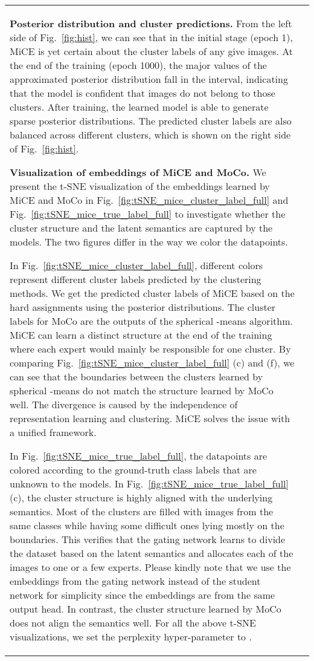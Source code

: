 \documentclass{article} \usepackage{iclr2021_conference,times}
\begin{document}
\begin{table}[t]
\begin{subtable}[h]{0.49\textwidth}
{\begin{tabular}{@{}lc@{}}
{\bf Posterior distribution and cluster predictions.} From the left side of Fig.~\ref{fig:hist}, we can see that in the initial stage (epoch 1), MiCE is yet certain about the cluster labels of any give images. At the end of the training (epoch 1000), the major values of the approximated posterior distribution fall in the  interval, indicating that the model is confident that images do not belong to those clusters. After training, the learned model is able to generate sparse posterior distributions. The predicted cluster labels are also balanced across different clusters, which is shown on the right side of Fig.~\ref{fig:hist}.








{\bf Visualization of embeddings of MiCE and MoCo.} 
We present the t-SNE visualization of the embeddings learned by MiCE and MoCo in Fig.~\ref{fig:tSNE_mice_cluster_label_full} and Fig.~\ref{fig:tSNE_mice_true_label_full} to investigate whether the cluster structure and the latent semantics are captured by the models. The two figures differ in the way we color the datapoints. 

In Fig.~\ref{fig:tSNE_mice_cluster_label_full}, different colors represent different cluster labels predicted by the clustering methods. We get the predicted cluster labels of MiCE based on the hard assignments using the posterior distributions. The cluster labels for MoCo are the outputs of the spherical -means algorithm. MiCE can learn a distinct structure at the end of the training where each expert would mainly be responsible for one cluster. By comparing Fig.~\ref{fig:tSNE_mice_cluster_label_full} (c) and (f), we can see that the boundaries between the clusters learned by spherical -means do not match the structure learned by MoCo well. The divergence is caused by the independence of representation learning and clustering. MiCE solves the issue with a unified framework.



In Fig.~\ref{fig:tSNE_mice_true_label_full}, the datapoints are colored according to the ground-truth class labels that are unknown to the models. In Fig.~\ref{fig:tSNE_mice_true_label_full}(c), the cluster structure is highly aligned with the underlying semantics. Most of the clusters are filled with images from the same classes while having some difficult ones lying mostly on the boundaries. This verifies that the gating network learns to divide the dataset based on the latent semantics and allocates each of the images to one or a few experts. Please kindly note that we use the embeddings from the gating network instead of the student network for simplicity since the embeddings are from the same output head. In contrast, the cluster structure learned by MoCo does not align the semantics well. For all the above t-SNE visualizations, we set the perplexity hyper-parameter to . 











\end{tabular}}
\end{subtable}
\end{table}
\end{document}
